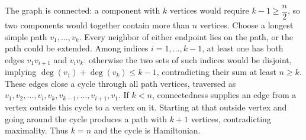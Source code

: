 The graph is connected: a component with $k$ vertices would require $k-1\ge\dfrac{n}{2}$, so two components would together contain more than $n$ vertices. Choose a longest simple path $v_1,\ldots,v_k$. Every neighbor of either endpoint lies on the path, or the path could be extended. Among indices $i=1,\ldots,k-1$, at least one has both edges $v_1v_{i+1}$ and $v_iv_k$: otherwise the two sets of such indices would be disjoint, implying $\deg(v_1)+\deg(v_k)\le k-1$, contradicting their sum at least $n\ge k$. These edges close a cycle through all path vertices, traversed as $v_1,v_2,\ldots,v_i,v_k,v_{k-1},\ldots,v_{i+1},v_1$. If $k<n$, connectedness supplies an edge from a vertex outside this cycle to a vertex on it. Starting at that outside vertex and going around the cycle produces a path with $k+1$ vertices, contradicting maximality. Thus $k=n$ and the cycle is Hamiltonian.

